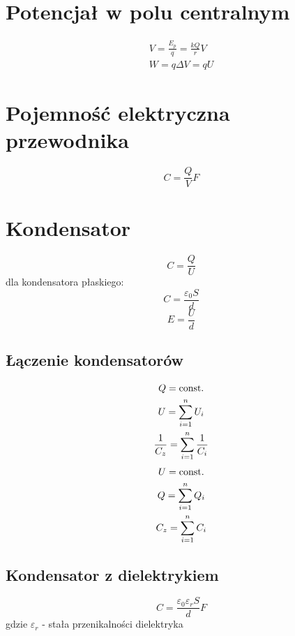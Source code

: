   \section{Potencjał w polu centralnym}
    \begin{gather}
      V = \frac{E_p}{q} = \frac{kQ}{r} \unit{V}\\
      W = q\Delta V = qU
    \end{gather}
  \section{Pojemność elektryczna przewodnika}
    \begin{equation}
      C = \frac{Q}{V} \unit{F}
    \end{equation}
  \section{Kondensator}
    \begin{equation}
      C= \frac{Q}{U}
    \end{equation}
    dla kondensatora płaskiego:
    \begin{equation}
      C= \frac{\varepsilon_0S}{d}
    \end{equation}
    \begin{equation}
      E = \frac{U}{d}
    \end{equation}
    \subsection{Łączenie kondensatorów}
      \begin{gather}
        Q = \operatorname{const.}\\
        U = \sum_{i=1}^n U_i\\
        \frac{1}{C_z} = \sum_{i=1}^n \frac{1}{C_i}
      \end{gather}
      \begin{gather}
        U = \operatorname{const.}\\
        Q = \sum_{i=1}^n Q_i\\
        C_z = \sum_{i=1}^n C_i
      \end{gather}
    \subsection{Kondensator z dielektrykiem}
    \begin{equation}
      C= \frac{\varepsilon_0\varepsilon_rS}{d} \unit{F}
    \end{equation}
    gdzie $\varepsilon_r$ - stała przenikalności dielektryka

